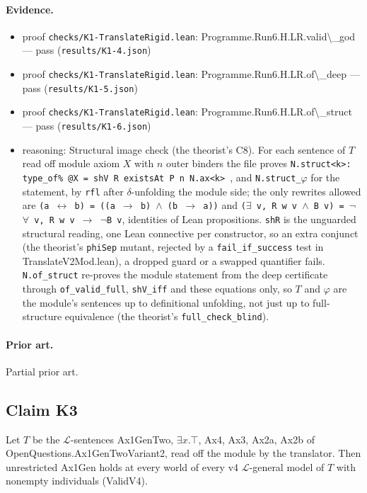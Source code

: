 \documentclass{article}
\begin{document}
\paragraph{Evidence.}
\begin{itemize}
\item proof \texttt{checks/K1-TranslateRigid.lean}: Programme.Run6.H.LR.valid\textbackslash{}\_god --- pass (\texttt{results/K1-4.json})
\item proof \texttt{checks/K1-TranslateRigid.lean}: Programme.Run6.H.LR.of\textbackslash{}\_deep --- pass (\texttt{results/K1-5.json})
\item proof \texttt{checks/K1-TranslateRigid.lean}: Programme.Run6.H.LR.of\textbackslash{}\_struct --- pass (\texttt{results/K1-6.json})
\item reasoning: Structural image check (the theorist's C8). For each sentence of $T$ read off module axiom $X$ with $n$ outer binders the file proves \texttt{N.struct\textless{}k\textgreater{}: type\_of\% @X = shV R existsAt P n N.ax\textless{}k\textgreater{} }, and \texttt{N.struct\_$\varphi$} for the statement, by \texttt{rfl} after $\delta$-unfolding the module side; the only rewrites allowed are \texttt{(a $\leftrightarrow$ b) = ((a $\to$ b) $\wedge$ (b $\to$ a))} and \texttt{($\exists$ v, R w v $\wedge$ B v) = $\neg$$\forall$ v, R w v $\to$ $\neg$B v}, identities of Lean propositions. \texttt{shR} is the unguarded structural reading, one Lean connective per constructor, so an extra conjunct (the theorist's \texttt{phiSep} mutant, rejected by a \texttt{fail\_if\_success} test in TranslateV2Mod.lean), a dropped guard or a swapped quantifier fails. \texttt{N.of\_struct} re-proves the module statement from the deep certificate through \texttt{of\_valid\_full}, \texttt{shV\_iff} and these equations only, so $T$ and $\varphi$ are the module's sentences up to definitional unfolding, not just up to full-structure equivalence (the theorist's \texttt{full\_check\_blind}).
\end{itemize}

\paragraph{Prior art.} Partial prior art.

\subsection*{Claim K3}

Let $T$ be the $\mathcal L$-sentences Ax1GenTwo, $\exists x.\top$, Ax4, Ax3, Ax2a, Ax2b of OpenQuestions.Ax1GenTwoVariant2, read off the module by the translator. Then unrestricted Ax1Gen holds at every world of every v4 $\mathcal L$-general model of $T$ with nonempty individuals (ValidV4).
\end{document}
